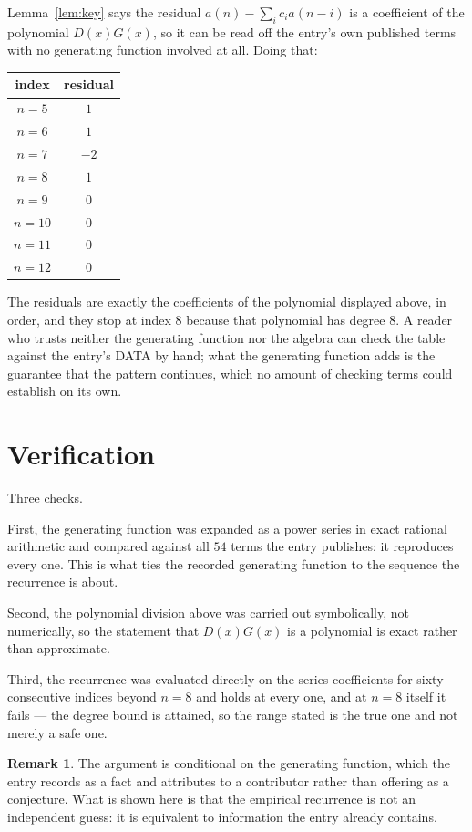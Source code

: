 \documentclass[11pt,a4paper]{article}
\theoremstyle{plain}
\theoremstyle{definition}
\newtheorem{remark}[theorem]{Remark}
\begin{document}
Lemma~\ref{lem:key} says the residual $a(n)-\sum_ic_ia(n-i)$ is a coefficient of the
polynomial $D(x)G(x)$, so it can be read off the entry's own published terms with no
generating function involved at all. Doing that:
\begin{center}
\begin{tabular}{cc}
index & residual \\ \hline
$n=5$ & $1$ \\
$n=6$ & $1$ \\
$n=7$ & $-2$ \\
$n=8$ & $1$ \\
$n=9$ & $0$ \\
$n=10$ & $0$ \\
$n=11$ & $0$ \\
$n=12$ & $0$
\end{tabular}
\end{center}
The residuals are exactly the coefficients of the polynomial displayed above, in order, and
they stop at index $8$ because that polynomial has degree $8$. A reader who trusts
neither the generating function nor the algebra can check the table against the entry's DATA
by hand; what the generating function adds is the guarantee that the pattern continues, which
no amount of checking terms could establish on its own.

\section{Verification}

Three checks.

First, the generating function was expanded as a power series in exact rational arithmetic and
compared against all $54$ terms the entry publishes: it reproduces every one. This is
what ties the recorded generating function to the sequence the recurrence is about.

Second, the polynomial division above was carried out symbolically, not numerically, so the
statement that $D(x)G(x)$ is a polynomial is exact rather than approximate.

Third, the recurrence was evaluated directly on the series coefficients for sixty consecutive
indices beyond $n=8$ and holds at every one, and at $n=8$ itself it fails --- the
degree bound is attained, so the range stated is the true one and not merely a safe one.

\begin{remark}
The argument is conditional on the generating function, which the entry records as a fact and
attributes to a contributor rather than offering as a conjecture. What is shown here is that
the empirical recurrence is not an independent guess: it is equivalent to information the
entry already contains.
\end{remark}
\end{document}
